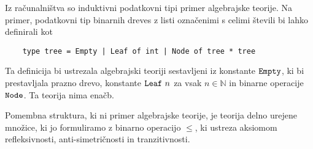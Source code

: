 \documentclass[../kategoricna_logika.tex]{subfiles}
\begin{document}
\begin{primer}
  Iz računalništva so induktivni podatkovni tipi primer algebrajske teorije.
  Na primer, podatkovni tip binarnih dreves z listi označenimi s celimi števili
  bi lahko definirali kot
  \begin{verbatim}
    type tree = Empty | Leaf of int | Node of tree * tree
  \end{verbatim}
  Ta definicija bi ustrezala algebrajski teoriji sestavljeni iz konstante $\verb|Empty|$,
  ki bi prestavljala prazno drevo, konstante $\verb|Leaf| \  n$ za vsak $n \in \mathbb{N}$
  in binarne operacije $\verb|Node|$. Ta teorija nima enačb. 
\end{primer}
\begin{primer}
  Pomembna struktura, ki ni primer algebrajske teorije, je teorija delno urejene množice,
  ki jo formuliramo z binarno operacijo $\leq$, ki ustreza aksiomom refleksivnosti,
  anti-simetričnosti in tranzitivnosti.
\end{primer}
%
%
\end{document}
